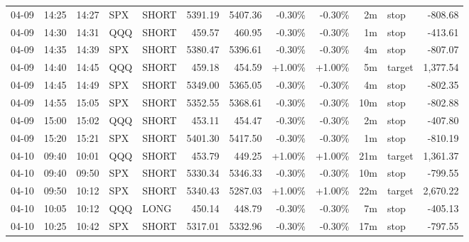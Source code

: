 \documentclass[11pt,a4paper]{article}
\begin{document}
\begin{center}
\begin{longtable}{>{\color{txtmain}}l l l l l r r r r r >{\color{txtmain}}l r}
04-09 & 14:25 & 14:27 & SPX & SHORT & 5391.19 & 5407.36 & \textcolor{lossred}{-0.30\%} & \textcolor{lossred}{-0.30\%} & 2m & stop & \textcolor{lossred}{-808.68} \\
04-09 & 14:30 & 14:31 & QQQ & SHORT & 459.57 & 460.95 & \textcolor{lossred}{-0.30\%} & \textcolor{lossred}{-0.30\%} & 1m & stop & \textcolor{lossred}{-413.61} \\
04-09 & 14:35 & 14:39 & SPX & SHORT & 5380.47 & 5396.61 & \textcolor{lossred}{-0.30\%} & \textcolor{lossred}{-0.30\%} & 4m & stop & \textcolor{lossred}{-807.07} \\
04-09 & 14:40 & 14:45 & QQQ & SHORT & 459.18 & 454.59 & \textcolor{wingreen}{+1.00\%} & \textcolor{wingreen}{+1.00\%} & 5m & target & \textcolor{wingreen}{1,377.54} \\
04-09 & 14:45 & 14:49 & SPX & SHORT & 5349.00 & 5365.05 & \textcolor{lossred}{-0.30\%} & \textcolor{lossred}{-0.30\%} & 4m & stop & \textcolor{lossred}{-802.35} \\
04-09 & 14:55 & 15:05 & SPX & SHORT & 5352.55 & 5368.61 & \textcolor{lossred}{-0.30\%} & \textcolor{lossred}{-0.30\%} & 10m & stop & \textcolor{lossred}{-802.88} \\
04-09 & 15:00 & 15:02 & QQQ & SHORT & 453.11 & 454.47 & \textcolor{lossred}{-0.30\%} & \textcolor{lossred}{-0.30\%} & 2m & stop & \textcolor{lossred}{-407.80} \\
04-09 & 15:20 & 15:21 & SPX & SHORT & 5401.30 & 5417.50 & \textcolor{lossred}{-0.30\%} & \textcolor{lossred}{-0.30\%} & 1m & stop & \textcolor{lossred}{-810.19} \\
04-10 & 09:40 & 10:01 & QQQ & SHORT & 453.79 & 449.25 & \textcolor{wingreen}{+1.00\%} & \textcolor{wingreen}{+1.00\%} & 21m & target & \textcolor{wingreen}{1,361.37} \\
04-10 & 09:40 & 09:50 & SPX & SHORT & 5330.34 & 5346.33 & \textcolor{lossred}{-0.30\%} & \textcolor{lossred}{-0.30\%} & 10m & stop & \textcolor{lossred}{-799.55} \\
04-10 & 09:50 & 10:12 & SPX & SHORT & 5340.43 & 5287.03 & \textcolor{wingreen}{+1.00\%} & \textcolor{wingreen}{+1.00\%} & 22m & target & \textcolor{wingreen}{2,670.22} \\
04-10 & 10:05 & 10:12 & QQQ & LONG & 450.14 & 448.79 & \textcolor{lossred}{-0.30\%} & \textcolor{lossred}{-0.30\%} & 7m & stop & \textcolor{lossred}{-405.13} \\
04-10 & 10:25 & 10:42 & SPX & SHORT & 5317.01 & 5332.96 & \textcolor{lossred}{-0.30\%} & \textcolor{lossred}{-0.30\%} & 17m & stop & \textcolor{lossred}{-797.55} \\

\end{longtable}
\end{center}
\end{document}
